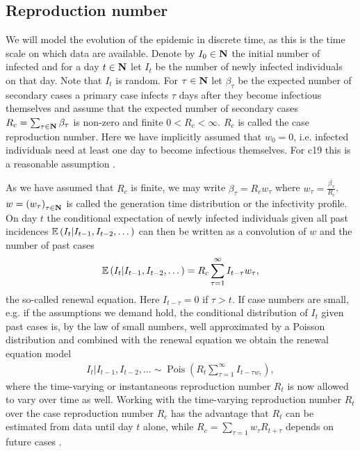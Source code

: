 \subsection{Reproduction number}
\label{subsec:reproduction_number}
We will model the evolution of the epidemic in discrete time, as this is the time scale on which data are available. Denote by $I_{0} \in \mathbf N$ the initial number of infected and for a day $t \in \mathbf N$ let $I_{t}$ be the number of newly infected individuals on that day. Note that $I_{t}$ is random. For $\tau\in\mathbf N$ let $\beta_{\tau}$ be the expected number of secondary cases a primary case infects $\tau$ days after they become infectious themselves and assume that the expected number of secondary cases $R_{c} = \sum_{\tau \in \mathbf N}\beta_{\tau}$ is non-zero and finite $0 < R_{c} < \infty$. $R_{c}$ is called the case reproduction number.  Here we have implicitly assumed that $w_{0} = 0$, i.e. infected individuals need at least one day to become infectious themselves. For \acrshort{c19} this is a reasonable assumption \citep{Lauer2020Incubation}. 

As we have assumed that $R_{c}$ is finite, we may write $\beta_{\tau} = R_{c}w_{\tau}$ where $w_{\tau} = \frac{\beta_{\tau}}{R_{c}}$. $w = \left( w_{\tau} \right)_{\tau \in \mathbf N}$ is called the generation time distribution or the infectivity profile. On day $t$ the conditional expectation of newly infected individuals given all past incidences $\mathbb E \left(I_{t}| I_{t - 1}, I_{t - 2}, \dots \right)$  can then be written as a convolution of $w$ and the number of past cases 
\begin{align}
    \label{eq:renewal-eq}
\mathbb E \left(I_{t}| I_{t - 1}, I_{t - 2}, \dots \right) = R_{c} \sum_{\tau = 1}^\infty I_{t - \tau} w_{\tau},
\end{align}
the so-called renewal equation. Here $I_{t - \tau} = 0$ if $\tau > t$. If case numbers are small, e.g. if the assumptions we demand hold, the conditional distribution of $I_{t}$ given past cases is, by the law of small numbers, well approximated by a Poisson distribution and combined with the renewal equation we obtain the renewal equation model \citep{Fraser2007Estimating}
\begin{align}
    \label{eq:renewal-model}
    I_{t} | I_{t - 1}, I_{t - 2}, \dots \sim \operatorname{Pois} \left( R_{t} \sum _{\tau = 1}^\infty I_{t - \tau w_{\tau}} \right),
\end{align}
where the time-varying or instantaneous reproduction number $R_{t}$ is now allowed to vary over time as well. Working with the time-varying reproduction number $R_{t}$ over the case reproduction number $R_{c}$ has the advantage that $R_{t}$ can be estimated from data until day $t$ alone, while $R_{c} = \sum_{\tau = 1} w_{\tau} R_{ t + \tau }$ depends on future cases \citep{Fraser2007Estimating}. 

